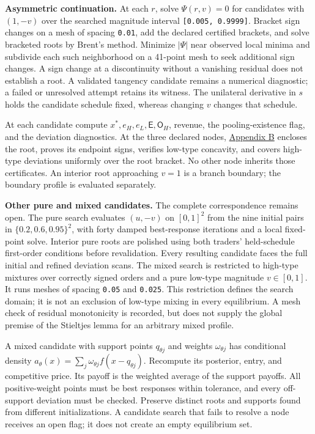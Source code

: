 \documentclass[
  11pt,
]{article}
\begin{document}
\textbf{Asymmetric continuation.} At each \(r\), solve \(\Psi(r,v)=0\)
for candidates with \((1,-v)\) over the searched magnitude interval
\texttt{{[}0.005,\ 0.9999{]}}. Bracket sign changes on a mesh of spacing
\texttt{0.01}, add the declared certified brackets, and solve bracketed
roots by Brent's method. Minimize \(|\Psi|\) near observed local minima
and subdivide each such neighborhood on a 41-point mesh to seek
additional sign changes. A sign change at a discontinuity without a
vanishing residual does not establish a root. A validated tangency
candidate remains a numerical diagnostic; a failed or unresolved attempt
retains its witness. The unilateral derivative in \(s\) holds the
candidate schedule fixed, whereas changing \(v\) changes that schedule.

At each candidate compute \(x^*,e_H,e_L,\mathsf E,\mathsf O_H\),
revenue, the pooling-existence flag, and the deviation diagnostics. At
the three declared nodes, \hyperref[oa-b]{Appendix B} encloses the root,
proves its endpoint signs, verifies low-type concavity, and covers
high-type deviations uniformly over the root bracket. No other node
inherits those certificates. An interior root approaching \(v=1\) is a
branch boundary; the boundary profile is evaluated separately.

\textbf{Other pure and mixed candidates.} The complete correspondence
remains open. The pure search evaluates \((u,-v)\) on \([0,1]^2\) from
the nine initial pairs in \(\{0.2,0.6,0.95\}^2\), with forty damped
best-response iterations and a local fixed-point solve. Interior pure
roots are polished using both traders' held-schedule first-order
conditions before revalidation. Every resulting candidate faces the full
initial and refined deviation scans. The mixed search is restricted to
high-type mixtures over correctly signed orders and a pure low-type
magnitude \(v\in[0,1]\). It runs meshes of spacing \texttt{0.05} and
\texttt{0.025}. This restriction defines the search domain; it is not an
exclusion of low-type mixing in every equilibrium. A mesh check of
residual monotonicity is recorded, but does not supply the global
premise of the Stieltjes lemma for an arbitrary mixed profile.

A mixed candidate with support points \(q_{\theta j}\) and weights
\(\omega_{\theta j}\) has conditional density
\(a_\theta(x)=\sum_j\omega_{\theta j}f(x-q_{\theta j})\). Recompute its
posterior, entry, and competitive price. Its payoff is the weighted
average of the support payoffs. All positive-weight points must be best
responses within tolerance, and every off-support deviation must be
checked. Preserve distinct roots and supports found from different
initializations. A candidate search that fails to resolve a node
receives an open flag; it does not create an empty equilibrium set.
\end{document}
